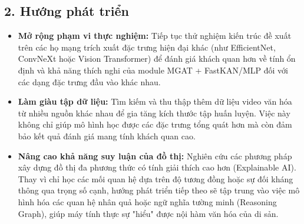 \subsection{2. Hướng phát triển}
\begin{itemize}[label={--}, itemsep=1pt]
    \item \textbf{Mở rộng phạm vi thực nghiệm:} Tiếp tục thử nghiệm kiến trúc đề xuất trên các họ mạng trích xuất đặc trưng hiện đại khác (như EfficientNet, ConvNeXt hoặc Vision Transformer) để đánh giá khách quan hơn về tính ổn định và khả năng thích nghi của module MGAT + FastKAN/MLP đối với các dạng đặc trưng đầu vào khác nhau.
    
    \item \textbf{Làm giàu tập dữ liệu:} Tìm kiếm và thu thập thêm dữ liệu video văn hóa từ nhiều nguồn khác nhau để gia tăng kích thước tập huấn luyện. Việc này không chỉ giúp mô hình học được các đặc trưng tổng quát hơn mà còn đảm bảo kết quả đánh giá mang tính khách quan cao.
    
    \item \textbf{Nâng cao khả năng suy luận của đồ thị:} Nghiên cứu các phương pháp xây dựng đồ thị đa phương thức có tính giải thích cao hơn (Explainable AI). Thay vì chỉ học các mối quan hệ dựa trên độ tương đồng hoặc sự đối kháng thông qua trọng số cạnh, hướng phát triển tiếp theo sẽ tập trung vào việc mô hình hóa các quan hệ nhân quả hoặc ngữ nghĩa tường minh (Reasoning Graph), giúp máy tính thực sự "hiểu" được nội hàm văn hóa của di sản.
\end{itemize}